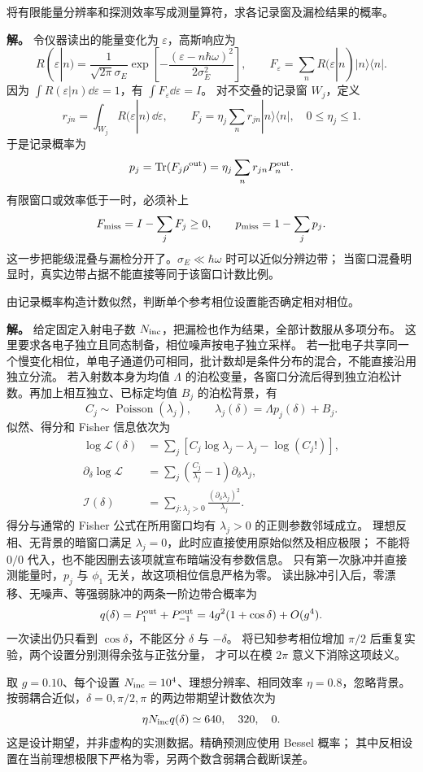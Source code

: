 \begin{exbox}
将有限能量分辨率和探测效率写成测量算符，求各记录窗及漏检结果的概率。

\textbf{解。} 令仪器读出的能量变化为 $\varepsilon$，高斯响应为
\[
 R(\varepsilon|n)=\frac{1}{\sqrt{2\pi}\sigma_E}
 \exp\!\left[-\frac{(\varepsilon-n\hbar\omega)^2}{2\sigma_E^2}\right],
 \qquad F_\varepsilon=\sum_nR(\varepsilon|n)|n\rangle\langle n|.
\]
因为 $\int R(\varepsilon|n)\dd\varepsilon=1$，有 $\int F_\varepsilon\dd\varepsilon=I$。
对不交叠的记录窗 $W_j$，定义
\[
 r_{jn}=\int_{W_j}R(\varepsilon|n)\,\dd\varepsilon,\qquad
 F_j=\eta_j\sum_nr_{jn}|n\rangle\langle n|,
 \quad 0\le\eta_j\le1.
\]
于是记录概率为
\[
 p_j=\operatorname{Tr}(F_j\rho^{\rm out})
 =\eta_j\sum_nr_{jn}P_n^{\rm out}.
\]
有限窗口或效率低于一时，必须补上
\[
 F_{\rm miss}=I-\sum_jF_j\ge0,\qquad
 p_{\rm miss}=1-\sum_jp_j.
\]
这一步把能级混叠与漏检分开了。$\sigma_E\ll\hbar\omega$ 时可以近似分辨边带；
当窗口混叠明显时，真实边带占据不能直接等同于该窗口计数比例。
\end{exbox}

\begin{exbox}
由记录概率构造计数似然，判断单个参考相位设置能否确定相对相位。

\textbf{解。} 给定固定入射电子数 $N_{\rm inc}$，把漏检也作为结果，全部计数服从多项分布。
这里要求各电子独立且同态制备，相位噪声按电子独立采样。
若一批电子共享同一个慢变化相位，单电子通道仍可相同，批计数却是条件分布的混合，不能直接沿用独立分流。
若入射数本身为均值 $\Lambda$ 的泊松变量，各窗口分流后得到独立泊松计数。再加上相互独立、已标定均值 $B_j$ 的泊松背景，有
\[
 C_j\sim\operatorname{Poisson}(\lambda_j),\qquad
 \lambda_j(\delta)=\Lambda p_j(\delta)+B_j.
\]
似然、得分和 Fisher 信息依次为
\begin{align*}
 \log\mathcal L(\delta)&=\sum_j[C_j\log\lambda_j-\lambda_j-\log(C_j!)],\\
 \partial_\delta\log\mathcal L&=\sum_j
 \left(\frac{C_j}{\lambda_j}-1\right)\partial_\delta\lambda_j,\\
 \mathcal I(\delta)&=\sum_{j:\lambda_j>0}
 \frac{(\partial_\delta\lambda_j)^2}{\lambda_j}.
\end{align*}
得分与通常的 Fisher 公式在所用窗口均有 $\lambda_j>0$ 的正则参数邻域成立。
理想反相、无背景的暗窗口满足 $\lambda_j=0$，此时应直接使用原始似然及相应极限；
不能将 $0/0$ 代入，也不能因删去该项就宣布暗端没有参数信息。
只有第一次脉冲并直接测能量时，$p_j$ 与 $\phi_1$ 无关，故这项相位信息严格为零。
读出脉冲引入后，零漂移、无噪声、等强弱脉冲的两条一阶边带合概率为
\[
 q(\delta)=P_1^{\rm out}+P_{-1}^{\rm out}
 =4g^2(1+\cos\delta)+O(g^4).
\]
一次读出仍只看到 $\cos\delta$，不能区分 $\delta$ 与 $-\delta$。
将已知参考相位增加 $\pi/2$ 后重复实验，两个设置分别测得余弦与正弦分量，
才可以在模 $2\pi$ 意义下消除这项歧义。

取 $g=0.10$、每个设置 $N_{\rm inc}=10^4$、理想分辨率、相同效率 $\eta=0.8$，忽略背景。
按弱耦合近似，$\delta=0,\pi/2,\pi$ 的两边带期望计数依次为
\[
 \eta N_{\rm inc}q(\delta)\simeq640,\quad320,\quad0.
\]
这是设计期望，并非虚构的实测数据。精确预测应使用 Bessel 概率；
其中反相设置在当前理想极限下严格为零，另两个数含弱耦合截断误差。
\end{exbox}

